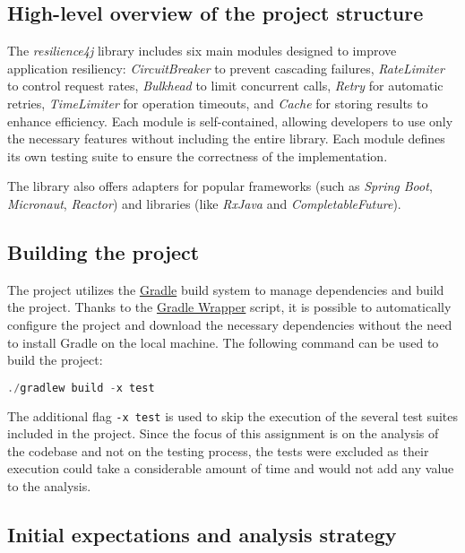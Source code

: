 \subsection{High-level overview of the project structure}

The \textit{resilience4j} library includes six main modules designed to improve application resiliency: \textit{CircuitBreaker} to prevent cascading failures, \textit{RateLimiter} to control request rates, \textit{Bulkhead} to limit concurrent calls, \textit{Retry} for automatic retries, \textit{TimeLimiter} for operation timeouts, and \textit{Cache} for storing results to enhance efficiency. Each module is self-contained, allowing developers to use only the necessary features without including the entire library. Each module defines its own testing suite to ensure the correctness of the implementation.

The library also offers adapters for popular frameworks (such as \textit{Spring Boot}, \textit{Micronaut}, \textit{Reactor}) and libraries (like \textit{RxJava} and \textit{CompletableFuture}).

\subsection{Building the project}

The project utilizes the \href{https://gradle.org/}{Gradle} build system to manage dependencies and build the project. Thanks to the \href{https://docs.gradle.org/current/userguide/gradle_wrapper.html}{Gradle Wrapper} script, it is possible to automatically configure the project and download the necessary dependencies without the need to install Gradle on the local machine. The following command can be used to build the project:

\begin{lstlisting}[language=C++, caption=Building the project]
                          ./gradlew build -x test
\end{lstlisting}

The additional flag \texttt{-x test} is used to skip the execution of the several test suites included in the project. Since the focus of this assignment is on the analysis of the codebase and not on the testing process, the tests were excluded as their execution could take a considerable amount of time and would not add any value to the analysis.

\subsection{Initial expectations and analysis strategy}
\label{sec:initial_expectations}

